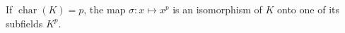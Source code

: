 If $\operatorname{char}(K) = p$, the map $\sigma: x \mapsto x^p$ is an isomorphism of $K$ onto one of its subfields $K^p$.
